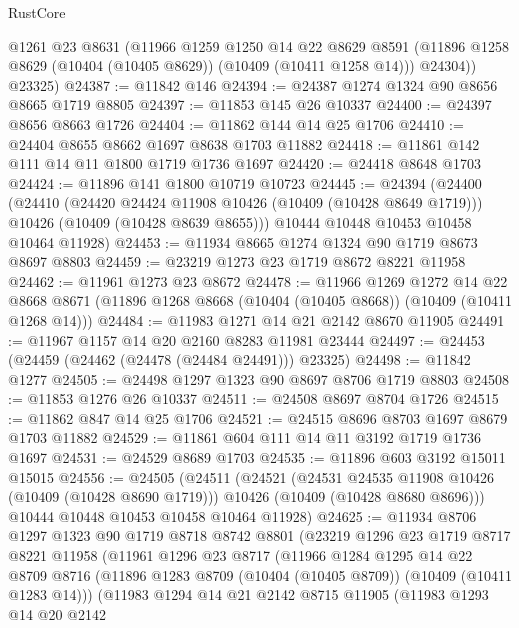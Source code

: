 \begin{lexlean}{RustCore}
\begin{coremodule}
        @1261
        @23
        @8631
        (@11966
          @1259
          @1250
          @14
          @22
          @8629
          @8591
          (@11896 @1258 @8629 (@10404 (@10405 @8629)) (@10409 (@10411 @1258 @14)))
          @24304))
      @23325)
@24387 := @11842 @146
@24394 := @24387 @1274 @1324 @90 @8656 @8665 @1719 @8805
@24397 := @11853 @145 @26 @10337
@24400 := @24397 @8656 @8663 @1726
@24404 := @11862 @144 @14 @25 @1706
@24410 := @24404 @8655 @8662 @1697 @8638 @1703 @11882
@24418 := @11861 @142 @111 @14 @11 @1800 @1719 @1736 @1697
@24420 := @24418 @8648 @1703
@24424 := @11896 @141 @1800 @10719 @10723
@24445 := @24394
    (@24400
      (@24410
        (@24420 @24424 @11908 @10426 (@10409 (@10428 @8649 @1719)))
        @10426
        (@10409 (@10428 @8639 @8655)))
      @10444
      @10448
      @10453
      @10458
      @10464
      @11928)
@24453 := @11934 @8665 @1274 @1324 @90 @1719 @8673 @8697 @8803
@24459 := @23219 @1273 @23 @1719 @8672 @8221 @11958
@24462 := @11961 @1273 @23 @8672
@24478 := @11966
    @1269
    @1272
    @14
    @22
    @8668
    @8671
    (@11896 @1268 @8668 (@10404 (@10405 @8668)) (@10409 (@10411 @1268 @14)))
@24484 := @11983 @1271 @14 @21 @2142 @8670 @11905
@24491 := @11967 @1157 @14 @20 @2160 @8283 @11981 @23444
@24497 := @24453 (@24459 (@24462 (@24478 (@24484 @24491))) @23325)
@24498 := @11842 @1277
@24505 := @24498 @1297 @1323 @90 @8697 @8706 @1719 @8803
@24508 := @11853 @1276 @26 @10337
@24511 := @24508 @8697 @8704 @1726
@24515 := @11862 @847 @14 @25 @1706
@24521 := @24515 @8696 @8703 @1697 @8679 @1703 @11882
@24529 := @11861 @604 @111 @14 @11 @3192 @1719 @1736 @1697
@24531 := @24529 @8689 @1703
@24535 := @11896 @603 @3192 @15011 @15015
@24556 := @24505
    (@24511
      (@24521
        (@24531 @24535 @11908 @10426 (@10409 (@10428 @8690 @1719)))
        @10426
        (@10409 (@10428 @8680 @8696)))
      @10444
      @10448
      @10453
      @10458
      @10464
      @11928)
@24625 := @11934
    @8706
    @1297
    @1323
    @90
    @1719
    @8718
    @8742
    @8801
    (@23219
      @1296
      @23
      @1719
      @8717
      @8221
      @11958
      (@11961
        @1296
        @23
        @8717
        (@11966
          @1284
          @1295
          @14
          @22
          @8709
          @8716
          (@11896 @1283 @8709 (@10404 (@10405 @8709)) (@10409 (@10411 @1283 @14)))
          (@11983
            @1294
            @14
            @21
            @2142
            @8715
            @11905
            (@11983
              @1293
              @14
              @20
              @2142

\end{coremodule}
\end{lexlean}
